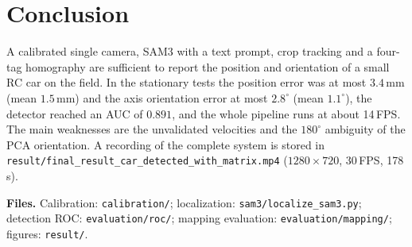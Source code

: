 \documentclass[10pt,a4paper]{article}
\begin{document}
\section{Conclusion}

A calibrated single camera, SAM3 with a text prompt, crop tracking and a
four-tag homography are sufficient to report the position and orientation of
a small RC car on the field.  In the stationary tests the position error was
at most $3.4$\,mm (mean $1.5$\,mm) and the axis orientation error at most
$2.8^\circ$ (mean $1.1^\circ$), the detector reached an AUC of $0.891$, and the
whole pipeline runs at about 14\,FPS.  The main weaknesses are the unvalidated
velocities and the $180^\circ$ ambiguity of the PCA orientation.  A recording
of the complete system is stored in
\texttt{result/final\_result\_car\_detected\_with\_matrix.mp4}
($1280\times720$, 30\,FPS, 178\,s).

\medskip
\textbf{Files.}  Calibration: \texttt{calibration/}; localization:
\texttt{sam3/localize\_sam3.py}; detection ROC:
\texttt{evaluation/roc/}; mapping evaluation:
\texttt{evaluation/mapping/}; figures: \texttt{result/}.
\end{document}

